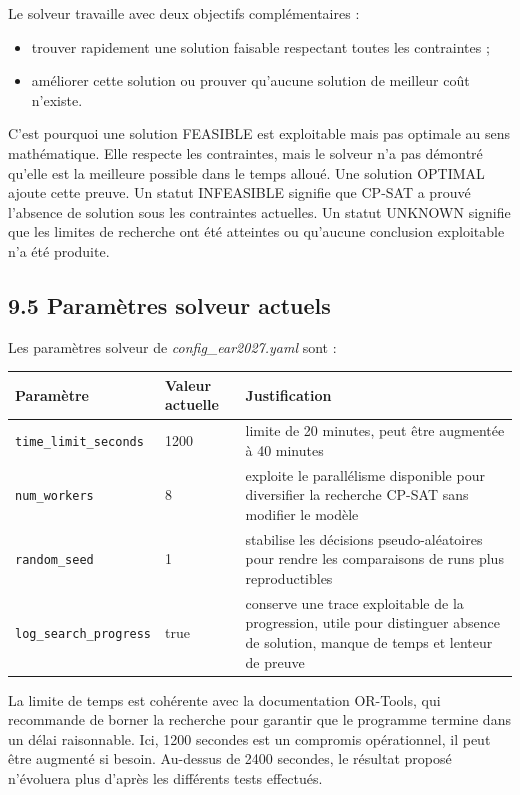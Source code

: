 \documentclass[11pt,a4paper]{article}
\begin{document}
Le solveur travaille avec deux objectifs complémentaires :

\begin{itemize}
\item trouver rapidement une solution faisable respectant toutes les contraintes ;
\item améliorer cette solution ou prouver qu'aucune solution de meilleur coût
n'existe.

\end{itemize}

C'est pourquoi une solution FEASIBLE est exploitable mais pas optimale au sens mathématique. Elle respecte les contraintes, mais le solveur n'a pas démontré qu'elle est la meilleure possible dans le temps alloué. Une solution OPTIMAL ajoute cette preuve. Un statut INFEASIBLE signifie que CP-SAT a prouvé l'absence de solution sous les contraintes actuelles. Un statut UNKNOWN signifie que les limites de recherche ont été atteintes ou qu'aucune conclusion exploitable n'a été produite.

\subsection{9.5 Paramètres solveur actuels}

Les paramètres solveur de \textit{config\_ear2027.yaml} sont :

\begin{longtable}{|L{0.24\textwidth}|L{0.18\textwidth}|L{0.48\textwidth}|}
\hline
Paramètre & Valeur actuelle & Justification \\
\hline
\endhead
\texttt{time\_limit\_seconds} & 1200 & limite de 20 minutes, peut être augmentée à 40 minutes \\
\hline
\texttt{num\_workers} & 8 & exploite le parallélisme disponible pour diversifier la recherche CP-SAT sans modifier le modèle \\
\hline
\texttt{random\_seed} & 1 & stabilise les décisions pseudo-aléatoires pour rendre les comparaisons de runs plus reproductibles \\
\hline
\texttt{log\_search\_progress} & true & conserve une trace exploitable de la progression, utile pour distinguer absence de solution, manque de temps et lenteur de preuve \\
\hline
\end{longtable}

La limite de temps est cohérente avec la documentation OR-Tools, qui recommande de borner la recherche pour garantir que le programme termine dans un délai raisonnable. Ici, 1200 secondes est un compromis opérationnel, il peut être augmenté si besoin. Au-dessus de 2400 secondes, le résultat proposé n'évoluera plus d'après les différents tests effectués.
\end{document}
